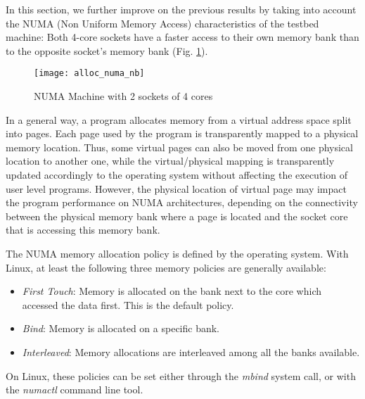 
In this section, we further improve on the previous results by taking into
account the NUMA (Non Uniform Memory Access) characteristics of the
testbed machine: Both 4-core sockets have a faster access to their
own memory bank than to the opposite socket's memory bank (Fig. \ref{fig:alloc_numa}).

\begin{figure}[!t]
  \centering
  \texttt{[image: alloc\_numa\_nb]}
  \caption{NUMA Machine with 2 sockets of 4 cores}
  \label{fig:alloc_numa}
\end{figure}

In a general way, a program allocates memory from a virtual address space
split into pages. Each page used by the program is transparently
mapped to a physical memory location. Thus, some virtual pages can
also be moved from one physical location to another one, while the
virtual/physical mapping is transparently updated accordingly to the
operating system without affecting the execution of user level
programs. However, the physical location of virtual page may
impact the program performance on NUMA architectures, depending on the
connectivity between the physical memory bank where a page is
located and the socket core that is accessing this memory bank.

The NUMA memory allocation policy is defined by the operating system.
With Linux, at least the following three memory policies are generally available:
\begin{itemize}
\item {\em First Touch}: Memory is allocated on the bank next to
  the core which accessed the data first. This is the default policy.
\item {\em Bind}: Memory is allocated on a specific bank.
\item {\em Interleaved}: Memory allocations are interleaved among
  all the banks available.
\end{itemize}
On Linux, these policies can be set either through the
\textit{mbind} system call, or with the {\em numactl} command line tool.

